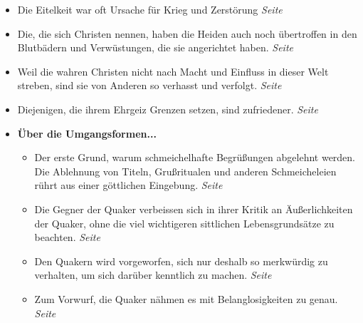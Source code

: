 \begin{itemize}
 \item Die Eitelkeit war oft Ursache für Krieg und Zerstörung
 \dotfill \textit{Seite~\pageref{ref:08_01_stolz}}\\

 \item Die, die sich Christen nennen, haben die Heiden auch noch übertroffen in
den Blutbädern und Verwüstungen, die sie angerichtet haben.
 \dotfill \textit{Seite~\pageref{ref:08_06_heiden}}\\

 \item Weil die wahren Christen nicht nach Macht und Einfluss in dieser Welt
streben, sind sie von Anderen so verhasst und verfolgt.
 \dotfill \textit{Seite~\pageref{ref:08_08_reich_gottes}}\\

 \item Diejenigen, die ihrem Ehrgeiz Grenzen setzen, sind zufriedener.
 \dotfill \textit{Seite~\pageref{ref:08_09_friedem}}\\

 \item \textbf{Über die Umgangsformen...}

\begin{itemize}

 \item Der erste Grund, warum schmeichelhafte Begrüßungen abgelehnt werden. Die
Ablehnung von Titeln, Grußritualen und anderen Schmeicheleien rührt aus einer
göttlichen Eingebung.
 \dotfill \textit{Seite~\pageref{ref:09_05_offenbarung}}\\

 \item Die Gegner der Quaker verbeissen sich in ihrer Kritik an Äußerlichkeiten
der Quaker, ohne die viel wichtigeren sittlichen Lebensgrundsätze zu beachten.
 \dotfill \textit{Seite~\pageref{ref:09_06_grundsaetze}}\\

 \item Den Quakern wird vorgeworfen, sich nur deshalb so merkwürdig zu
verhalten, um sich darüber kenntlich zu machen.
 \dotfill \textit{Seite~\pageref{ref:09_07_vorwurff}}\\

 \item Zum Vorwurf, die Quaker nähmen es mit Belanglosigkeiten zu genau.
 \dotfill \textit{Seite~\pageref{ref:09_08_vorwurff}}\\


\end{itemize}
\end{itemize}
